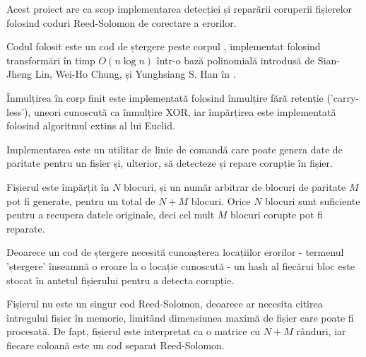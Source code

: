 \begin{abstractpage}

\begin{rezumat}

\indent

Acest proiect are ca scop implementarea detecției și reparării coruperii fișierelor folosind coduri Reed-Solomon de corectare a erorilor.

Codul folosit este un cod de ștergere peste corpul , implementat folosind transformări în timp $O(n \log n)$ într-o bază polinomială introdusă de Sian-Jheng Lin, Wei-Ho Chung, și Yunghsiang S. Han în \cite{novel-poly}.

Înmulțirea în corp finit este implementată folosind înmulțire fără retenție ('carry-less'), uneori cunoscută ca înmulțire XOR, iar împărțirea este implementată folosind algoritmul extins al lui Euclid.

Implementarea este un utilitar de linie de comandă care poate genera date de paritate pentru un fișier și, ulterior, să detecteze și repare corupție în fișier.

Fișierul este împărțit în $N$ blocuri, și un număr arbitrar de blocuri de paritate $M$ pot fi generate, pentru un total de $N + M$ blocuri.
Orice $N$ blocuri sunt suficiente pentru a recupera datele originale, deci cel mult $M$ blocuri corupte pot fi reparate.

Deoarece un cod de ștergere necesită cunoașterea locațiilor erorilor - termenul 'ștergere' înseamnă o eroare la o locație cunoscută - un hash al fiecărui bloc este stocat în antetul fișierului pentru a detecta corupție.

Fișierul nu este un singur cod Reed-Solomon, deoarece ar necesita citirea întregului fișier în memorie, limitând dimensiunea maximă de fișier care poate fi procesată.
De fapt, fișierul este interpretat ca o matrice cu $N + M$ rânduri, iar fiecare coloană este un cod separat Reed-Solomon.

\end{rezumat}

\end{abstractpage}
